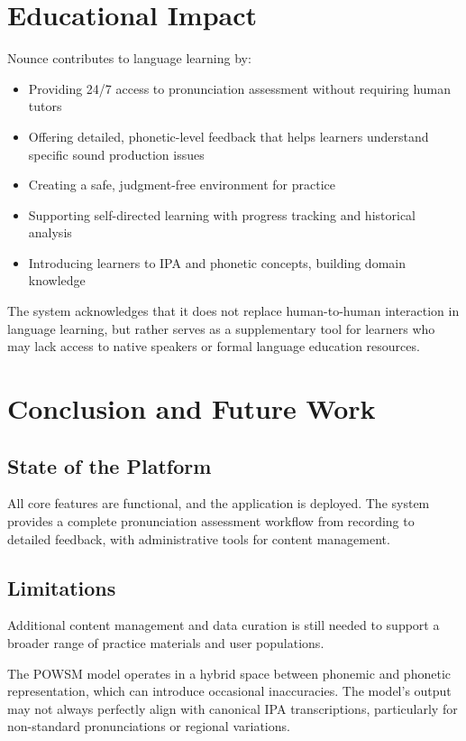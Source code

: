 \documentclass[a4paper,12pt]{report}
\begin{document}
\section{Educational Impact}

Nounce contributes to language learning by:
\begin{itemize}
    \item Providing 24/7 access to pronunciation assessment without requiring human tutors
    \item Offering detailed, phonetic-level feedback that helps learners understand specific sound production issues
    \item Creating a safe, judgment-free environment for practice
    \item Supporting self-directed learning with progress tracking and historical analysis
    \item Introducing learners to IPA and phonetic concepts, building domain knowledge
\end{itemize}

The system acknowledges that it does not replace human-to-human interaction in language learning, but rather serves as a supplementary tool for learners who may lack access to native speakers or formal language education resources.

\section{Conclusion and Future Work}

\subsection{State of the Platform}

All core features are functional, and the application is deployed. The system provides a complete pronunciation assessment workflow from recording to detailed feedback, with administrative tools for content management.

\subsection{Limitations}

Additional content management and data curation is still needed to support a broader range of practice materials and user populations.

The POWSM \cite{powsm} model operates in a hybrid space between phonemic and phonetic representation, which can introduce occasional inaccuracies. The model's output may not always perfectly align with canonical IPA transcriptions, particularly for non-standard pronunciations or regional variations.
\end{document}
